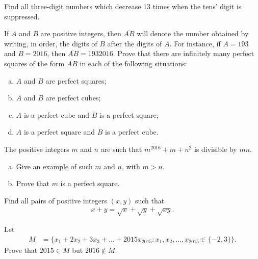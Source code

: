\documentclass[problems.tex]{subfile}
\begin{document}
	\begin{problem}
		Find all three-digit numbers which decrease 13 times when the tens'	digit is suppressed.
	\end{problem}


	\begin{problem}
		If $A$ and $B$ are positive integers, then $\overline{AB}$ will denote the number obtained by writing, in order, the digits of $B$ after the digits of $A$. For instance, if $A = 193$ and $B = 2016$, then $\overline{AB} = 1932016$.
		Prove that there are infinitely many perfect squares of the form $\overline{AB}$ in each of the following situations:
		\begin{enumerate}[(a)]
			\item $A$ and $B$ are perfect squares;
			\item $A$ and $B$ are perfect cubes;
			\item $A$ is a perfect cube and $B$ is a perfect square;
			\item $A$ is a perfect square and $B$ is a perfect cube.
		\end{enumerate}
	\end{problem}


	\begin{problem}
		The positive integers $m$ and $n$ are such that $m^{2016}+m+n^2$ is divisible
		by $mn$.
		\begin{enumerate}[(a)]
			\item Give an example of such $m$ and $n$, with $m > n$.
			\item Prove that $m$ is a perfect square.
		\end{enumerate}
	\end{problem}


	\begin{problem}
		Find all pairs of positive integers $(x,y)$ such that
		\begin{align*}
			x + y = \sqrt x + \sqrt y + \sqrt{xy}.
		\end{align*}
	\end{problem}



	\begin{problem}
		Let
		\begin{align*}
			M &= \bigg\{x_1 + 2x_2 + 3x_3 + \dots + 2015x_{2015} : x_1, x_2, \dots, 	x_{2015} \in \{-2, 3\}\bigg\}.
		\end{align*}
		Prove that $2015 \in M$ but $2016 \not \in M$.
	\end{problem}
\end{document}
